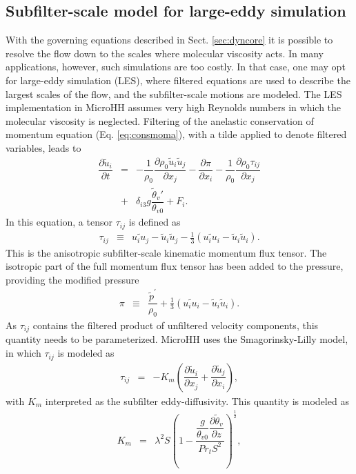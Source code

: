 \documentclass[gmd,manuscript]{copernicus}
\newcommand{\uf}{\ensuremath{\widetilde{u}}}
\newcommand{\thetaf}{\ensuremath{\widetilde{\theta}}}
\begin{document}
\subsection{Subfilter-scale model for large-eddy simulation}
With the governing equations described in Sect. \ref{sec:dyncore} it is possible to resolve the flow down to the scales where molecular viscosity acts. In many applications, however, such simulations are too costly. In that case, one may opt for large-eddy simulation (LES), where filtered equations are used to describe the largest scales of the flow, and the subfilter-scale motions are modeled. The LES implementation in MicroHH assumes very high Reynolds numbers in which the molecular viscosity is neglected. Filtering of the anelastic conservation of momentum equation (Eq. \ref{eq:consmoma}), with a tilde applied to denote filtered variables, leads to 
\begin{eqnarray}
\nonumber \dfrac{\partial \uf_i}{\partial t} & = & - \dfrac{1}{\rho_0} \dfrac{\partial \rho_0 \uf_i \uf_j}{\partial x_j} 
- \dfrac{\partial \pi}{\partial x_i} - \dfrac{1}{\rho_0} \dfrac{\partial \rho_0 \tau_{ij}}{\partial x_j}\\
& + & \delta_{i3} g \dfrac{\thetaf_v'}{\theta_{v0}} + F_i.\label{eq:consmoma_filter}
\end{eqnarray}
In this equation, a tensor $\tau_{ij}$ is defined as
\begin{eqnarray}
\tau_{ij}  & \equiv & \widetilde{u_i u_j} - \uf_i \uf_j - \frac{1}{3} \left( \widetilde{u_i u_i} - \uf_i \uf_i \right).
\end{eqnarray}
This is the anisotropic subfilter-scale kinematic momentum flux tensor. The isotropic part of the full momentum flux tensor has been added to the pressure, providing the modified pressure
\begin{eqnarray}
\pi & \equiv & \dfrac{\widetilde{p}^\prime}{\rho_0} + \frac{1}{3} \left( \widetilde{u_i u_i} - \uf_i \uf_i \right).
\end{eqnarray}
As $\tau_{ij}$ contains the filtered product of unfiltered velocity components, this quantity needs to be parameterized. MicroHH uses the Smagorinsky-Lilly \citep{Lilly1968} model, in which $\tau_{ij}$ is modeled as
\begin{eqnarray}
\tau_{ij} & = & -K_m \left( \dfrac{\partial \uf_i}{\partial x_j} + \dfrac{\partial \uf_j}{\partial x_i} \right),
\end{eqnarray}
with $K_m$ interpreted as the subfilter eddy-diffusivity. This quantity is modeled as 
\begin{eqnarray}
K_m    & = & \lambda^2 S
\left(1 - \dfrac{  \dfrac{g}{\theta_{v0}} \dfrac{\partial \thetaf_v}{\partial z}}{Pr_t S^2} \right)^\frac{1}{2},
\end{eqnarray}
\end{document}

